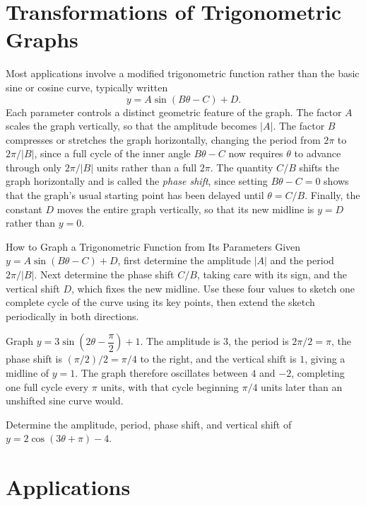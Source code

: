 \section{Transformations of Trigonometric Graphs}

Most applications involve a modified trigonometric function rather than the
basic sine or cosine curve, typically written
\[
y = A\sin(B\theta - C) + D.
\]
Each parameter controls a distinct geometric feature of the graph. The
factor $A$ scales the graph vertically, so that the amplitude becomes
$|A|$. The factor $B$ compresses or stretches the graph horizontally,
changing the period from $2\pi$ to $2\pi/|B|$, since a full cycle of the
inner angle $B\theta - C$ now requires $\theta$ to advance through only
$2\pi/|B|$ units rather than a full $2\pi$. The quantity $C/B$ shifts the
graph horizontally and is called the \emph{phase shift}, since setting
$B\theta - C = 0$ shows that the graph's usual starting point has been
delayed until $\theta = C/B$. Finally, the constant $D$ moves the entire
graph vertically, so that its new midline is $y = D$ rather than $y = 0$.

\begin{algorithmproc}{How to Graph a Trigonometric Function from Its Parameters}
Given $y = A\sin(B\theta - C) + D$, first determine the amplitude $|A|$ and
the period $2\pi/|B|$. Next determine the phase shift $C/B$, taking care
with its sign, and the vertical shift $D$, which fixes the new midline.
Use these four values to sketch one complete cycle of the curve using its
key points, then extend the sketch periodically in both directions.
\end{algorithmproc}

\begin{example}
Graph $y = 3\sin\left(2\theta - \dfrac{\pi}{2}\right) + 1$. The amplitude is
$3$, the period is $2\pi/2 = \pi$, the phase shift is $(\pi/2)/2 = \pi/4$
to the right, and the vertical shift is $1$, giving a midline of $y=1$. The
graph therefore oscillates between $4$ and $-2$, completing one full cycle
every $\pi$ units, with that cycle beginning $\pi/4$ units later than an
unshifted sine curve would.
\end{example}

\begin{practicenow}
Determine the amplitude, period, phase shift, and vertical shift of
$y = 2\cos(3\theta + \pi) - 4$.
\end{practicenow}

\section{Applications}

